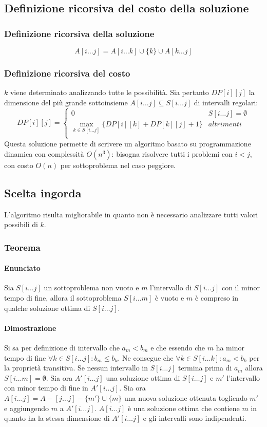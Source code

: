 		\subsection{Definizione ricorsiva del costo della soluzione}
		\subsubsection{Definizione ricorsiva della soluzione}
		$$A[i\dots j] = A[i\dots k] \cup \{k\}\cup A[k\dots j]$$
		\subsubsection{Definizione ricorsiva del costo}
		$k$ viene determinato analizzando tutte le possibilit\`a. Sia pertanto $DP[i][j]$ la dimensione del pi\`u grande sottoinsieme $A[i\dots j]\subseteq S[i\dots j]$ di intervalli regolari:
		$$ DP[i][j] = \begin{cases}
			0 & S[i\dots j] = \emptyset\\
			\max\limits_{k\in S[i\dots j]}\{DP[i][k]+DP[k][j]+1\} & altrimenti\\
		\end{cases}$$
		Questa soluzione permette di scrivere un algoritmo basato su programmazione dinamica con complessit\`a $O(n^3)$: bisogna risolvere tutti i problemi con $i<j$, con costo $O(n)$ per 
		sottoproblema nel caso peggiore.
		\subsection{Scelta ingorda}
		L'algoritmo risulta migliorabile in quanto non \`e necessario analizzare tutti valori possibili di $k$.
		\subsubsection{Teorema}
		\paragraph{Enunciato}
		Sia $S[i\dots j]$ un sottoproblema non vuoto e $m$ l'intervallo di $S[i\dots j]$ con il minor tempo di fine, allora il sottoproblema $S[i\dots m]$ \`e vuoto e $m$ \`e compreso in 
		qualche soluzione ottima di $S[i\dots j]$.
		\paragraph{Dimostrazione}
		Si sa per definizione di intervallo che $a_m<b_m$ e che essendo che $m$ ha minor tempo di fine $\forall k\in S[i\dots j]:b_m\le b_k$. Ne consegue che $\forall k\in S[i\dots k]:a_m<b_k$
		per la propriet\`a transitiva. Se nessun intervallo in $S[i\dots j]$ termina prima di $a_m$ allora $S[i\dots m] = \emptyset$. Sia ora $A'[i\dots j]$ una soluzione ottima di $S[i\dots j]$
		e $m'$ l'intervallo con minor tempo di fine in $A'[i\dots j]$. Sia ora $A[i\dots j] = A-[j\dots j]-\{m'\}\cup \{m\}$ una nuova soluzione ottenuta togliendo $m'$ e aggiungendo $m$ a
		$A'[i\dots j]$. $A[i\dots j]$ \`e una soluzione ottima che contiene $m$ in quanto ha la stessa dimensione di $A'[i\dots j]$ e gli intervalli sono indipendenti. 
